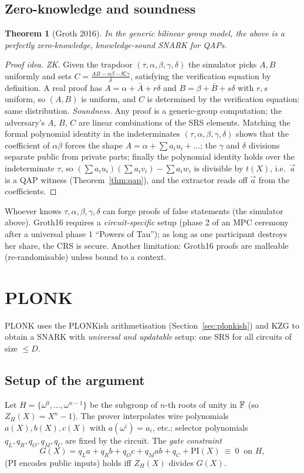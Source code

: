 \documentclass[11pt,a4paper]{report}
\theoremstyle{plain}
\newtheorem{theorem}{Theorem}[chapter]
\theoremstyle{definition}
\theoremstyle{remark}
\begin{document}
\subsection{Zero-knowledge and soundness}
\begin{theorem}[Groth 2016]
In the generic bilinear group model, the above is a perfectly zero-knowledge, knowledge-sound SNARK for QAPs.
\end{theorem}
\begin{proof}[Proof idea]
\emph{ZK.} Given the trapdoor $(\tau,\alpha,\beta,\gamma,\delta)$ the simulator picks $A,B$ uniformly and sets $C=\frac{AB-\alpha\beta-\mathsf{IC}\gamma}{\delta}$, satisfying the verification equation by definition. A real proof has $A=\alpha+\bar A+r\delta$ and $B=\beta+\bar B+s\delta$ with $r,s$ uniform, so $(A,B)$ is uniform, and $C$ is determined by the verification equation: same distribution.
\emph{Soundness.} Any proof is a generic-group computation; the adversary's $A$, $B$, $C$ are linear combinations of the SRS elements. Matching the formal polynomial identity in the indeterminates $(\tau,\alpha,\beta,\gamma,\delta)$ shows that the coefficient of $\alpha\beta$ forces the shape $A=\alpha+\sum a_iu_i+\dots$; the $\gamma$ and $\delta$ divisions separate public from private parts; finally the polynomial identity holds over the indeterminate $\tau$, so $(\sum a_iu_i)(\sum a_iv_i)-\sum a_iw_i$ is divisible by $t(X)$, i.e.\ $\vec a$ is a QAP witness (Theorem~\ref{thm:qap}), and the extractor reads off $\vec a$ from the coefficients.
\end{proof}
\begin{warning}
Whoever knows $\tau,\alpha,\beta,\gamma,\delta$ can forge proofs of false statements (the simulator above). Groth16 requires a \emph{circuit-specific} setup (phase 2 of an MPC ceremony after a universal phase 1 ``Powers of Tau''); as long as one participant destroys her share, the CRS is secure. Another limitation: Groth16 proofs are malleable (re-randomisable) unless bound to a context.
\end{warning}

\section{PLONK}
PLONK \cite{GWC19} uses the PLONKish arithmetisation (Section~\ref{sec:plonkish}) and KZG to obtain a SNARK with \emph{universal and updatable} setup: one SRS for all circuits of size $\le D$.
\subsection{Setup of the argument}
Let $H=\{\omega^0,\dots,\omega^{n-1}\}$ be the subgroup of $n$-th roots of unity in $\mathbb{F}$ (so $Z_H(X)=X^n-1$). The prover interpolates wire polynomials $a(X),b(X),c(X)$ with $a(\omega^i)=a_i$, etc.; selector polynomials $q_L,q_R,q_O,q_M,q_C$ are fixed by the circuit. The \emph{gate constraint}
\[G(X)=q_La+q_Rb+q_Oc+q_Mab+q_C+\mathrm{PI}(X)\ \equiv\ 0\ \text{ on }H,\]
($\mathrm{PI}$ encodes public inputs) holds iff $Z_H(X)$ divides $G(X)$.
\end{document}
